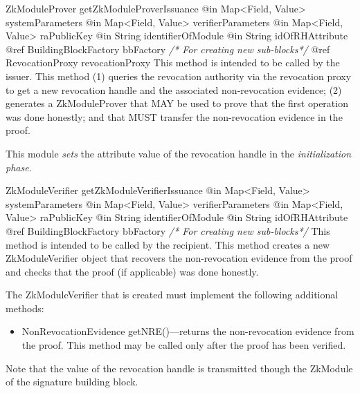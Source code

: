       \begin{method}
      {ZkModuleProver}
      {getZkModuleProverIssuance}
      {
        {@in Map<Field, Value> systemParameters}
        {@in Map<Field, Value> verifierParameters}
        {@in Map<Field, Value> raPublicKey}
        {@in String identifierOfModule}
        {@in String idOfRHAttribute}
        {@ref BuildingBlockFactory bbFactory \textrm{\emph{/* For creating new sub-blocks*/}}}
        {@ref RevocationProxy revocationProxy}
      }
      This method is intended to be called by the issuer.
      This method (1) queries the revocation authority via the revocation proxy
      to get a new revocation handle and the associated non-revocation evidence;
      (2) generates a ZkModuleProver that MAY be used to prove that the first
      operation was done honestly; and that MUST transfer the non-revocation evidence
      in the proof.

      This module \emph{sets} the attribute value of the revocation handle in the \emph{initialization phase}.
      \end{method}

      \begin{method}
      {ZkModuleVerifier}
      {getZkModuleVerifierIssuance}
      {
        {@in Map<Field, Value> systemParameters}
        {@in Map<Field, Value> verifierParameters}
        {@in Map<Field, Value> raPublicKey}
        {@in String identifierOfModule}
        {@in String idOfRHAttribute}
        {@ref BuildingBlockFactory bbFactory \textrm{\emph{/* For creating new sub-blocks*/}}}
      }
      This method is intended to be called by the recipient.
      This method creates a new ZkModuleVerifier object that recovers the
      non-revocation evidence from the proof and checks that the proof
      (if applicable) was done honestly.

      The ZkModuleVerifier that is created must implement the following additional methods:
      \begin{itemize}
        \item NonRevocationEvidence getNRE()---returns the non-revocation evidence from the proof. This method may
        be called only after the proof has been verified.
      \end{itemize}
      Note that the value of the revocation handle is transmitted though the ZkModule of the signature building block.
      \end{method}
